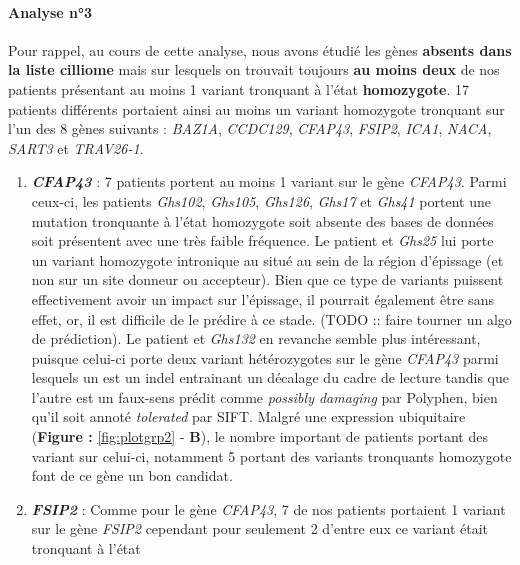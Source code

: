 \documentclass[12pt,twoside]{reedthesis}
\theoremstyle{definition}
\theoremstyle{definition}
\theoremstyle{remark}
\begin{document}
  \newpage
  
  \paragraph{Analyse n°3}\label{analyse-n3}
  
  Pour rappel, au cours de cette analyse, nous avons étudié les gènes
  \textbf{absents dans la liste cilliome} mais sur lesquels on trouvait
  toujours \textbf{au moins deux} de nos patients présentant au moins 1
  variant tronquant à l'état \textbf{homozygote}. 17 patients différents
  portaient ainsi au moins un variant homozygote tronquant sur l'un des 8
  gènes suivants : \emph{BAZ1A}, \emph{CCDC129}, \emph{CFAP43},
  \emph{FSIP2}, \emph{ICA1}, \emph{NACA}, \emph{SART3} et \emph{TRAV26-1}.
  
  \begin{enumerate}
  \def\labelenumi{\arabic{enumi}.}
  \item
    \textbf{\emph{CFAP43}} : 7 patients portent au moins 1 variant sur le
    gène \emph{CFAP43}. Parmi ceux-ci, les patients \emph{Ghs102},
    \emph{Ghs105}, \emph{Ghs126}, \emph{Ghs17} et \emph{Ghs41} portent une
    mutation tronquante à l'état homozygote soit absente des bases de
    données soit présentent avec une très faible fréquence. Le patient et
    \emph{Ghs25} lui porte un variant homozygote intronique au situé au
    sein de la région d'épissage (et non sur un site donneur ou
    accepteur). Bien que ce type de variants puissent effectivement avoir
    un impact sur l'épissage, il pourrait également être sans effet, or,
    il est difficile de le prédire à ce stade. (TODO :: faire tourner un
    algo de prédiction). Le patient et \emph{Ghs132} en revanche semble
    plus intéressant, puisque celui-ci porte deux variant hétérozygotes
    sur le gène \emph{CFAP43} parmi lesquels un est un indel entrainant un
    décalage du cadre de lecture tandis que l'autre est un faux-sens
    prédit comme \emph{possibly damaging} par Polyphen, bien qu'il soit
    annoté \emph{tolerated} par SIFT. Malgré une expression ubiquitaire
    (\textbf{Figure : }\ref{fig:plotgrp2} - \textbf{B}), le nombre
    important de patients portant des variant sur celui-ci, notamment 5
    portant des variants tronquants homozygote font de ce gène un bon
    candidat.
  \item
    \textbf{\emph{FSIP2}} : Comme pour le gène \emph{CFAP43}, 7 de nos
    patients portaient 1 variant sur le gène \emph{FSIP2} cependant pour
    seulement 2 d'entre eux ce variant était tronquant à l'état

\end{enumerate}
\end{document}
